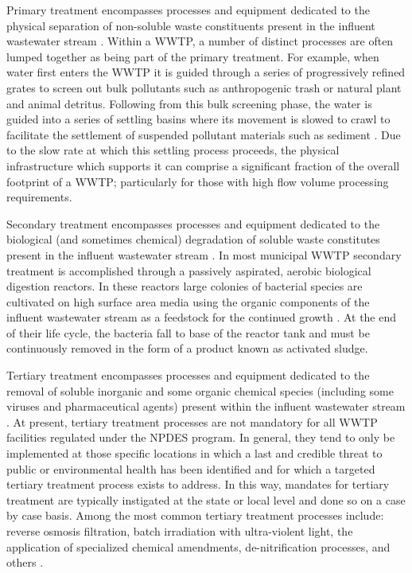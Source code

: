 Primary treatment encompasses processes and equipment dedicated to the physical separation of non-soluble waste constituents present in the influent wastewater stream \cite{Metcalf1991}. Within a WWTP, a number of distinct processes are often lumped together as being part of the primary treatment. For example, when water first enters the WWTP it is guided through a series of progressively refined grates to screen out bulk pollutants such as anthropogenic trash or natural plant and animal detritus. Following from this bulk screening phase, the water is guided into a series of settling basins where its movement is slowed to crawl to facilitate the settlement of suspended pollutant materials such as sediment \cite{Metcalf1991}. Due to the slow rate at which this settling process proceeds, the physical infrastructure which supports it can comprise a significant fraction of the overall footprint of a WWTP; particularly for those with high flow volume processing requirements.

Secondary treatment encompasses processes and equipment dedicated to the biological (and sometimes chemical) degradation of soluble waste constitutes present in the influent wastewater stream \cite{Metcalf1991}. In most municipal WWTP secondary treatment is accomplished through a passively aspirated, aerobic biological digestion reactors. In these reactors large colonies of bacterial species are cultivated on high surface area media using the organic components of the influent wastewater stream as a feedstock for the continued growth \cite{Metcalf1991}. At the end of their life cycle, the bacteria fall to base of the reactor tank and must be continuously removed in the form of a product known as activated sludge.

Tertiary treatment encompasses processes and equipment dedicated to the removal of soluble inorganic and some organic chemical species (including some viruses and pharmaceutical agents) present within the influent wastewater stream \cite{Metcalf1991}. At present, tertiary treatment processes are not mandatory for all WWTP facilities regulated under the NPDES program. In general, they tend to only be implemented at those specific locations in which a last and credible threat to public or environmental health has been identified and for which a targeted tertiary treatment process exists to address. In this way, mandates for tertiary treatment are typically instigated at the state or local level and done so on a case by case basis. Among the most common tertiary treatment processes include: reverse osmosis filtration, batch irradiation with ultra-violent light, the application of specialized chemical amendments, de-nitrification processes, and others \cite{Metcalf1991}.

